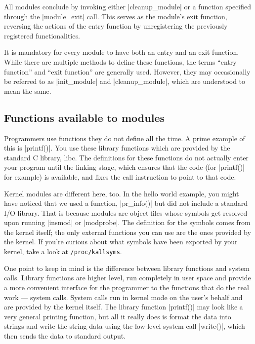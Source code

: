 \documentclass[10pt, oneside]{book}
\begin{document}
All modules conclude by invoking either \cpp|cleanup_module| or a function specified through the \cpp|module_exit| call.
This serves as the module's exit function, reversing the actions of the entry function by unregistering the previously registered functionalities.

It is mandatory for every module to have both an entry and an exit function.
While there are multiple methods to define these functions, the terms ``entry function'' and ``exit function'' are generally used.
However, they may occasionally be referred to as \cpp|init_module| and \cpp|cleanup_module|,
which are understood to mean the same.

\subsection{Functions available to modules}
\label{sec:avail_func}
Programmers use functions they do not define all the time.
A prime example of this is \cpp|printf()|.
You use these library functions which are provided by the standard C library, libc.
The definitions for these functions do not actually enter your program until the linking stage, which ensures that the code (for \cpp|printf()| for example) is available, and fixes the call instruction to point to that code.

Kernel modules are different here, too. In the hello world example, you might have noticed that we used a function, \cpp|pr_info()| but did not include a standard I/O library.
That is because modules are object files whose symbols get resolved upon running \sh|insmod| or \sh|modprobe|.
The definition for the symbols comes from the kernel itself; the only external functions you can use are the ones provided by the kernel.
If you're curious about what symbols have been exported by your kernel, take a look at \verb|/proc/kallsyms|.

One point to keep in mind is the difference between library functions and system calls. Library functions are higher level, run completely in user space and provide a more convenient interface for the programmer to the functions that do the real work --- system calls.
System calls run in kernel mode on the user's behalf and are provided by the kernel itself.
The library function \cpp|printf()| may look like a very general printing function, but all it really does is format the data into strings and write the string data using the low-level system call \cpp|write()|, which then sends the data to standard output.
\end{document}
